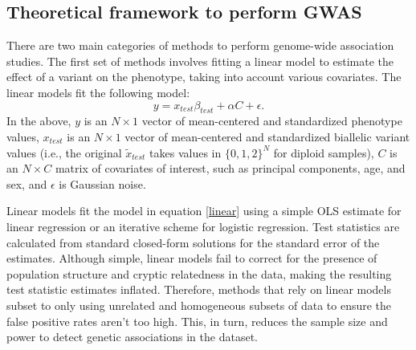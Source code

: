\subsection{Theoretical framework to perform GWAS}
\label{sec:ch1-lmm}
There are two main categories of methods to perform genome-wide association studies. The first set of methods involves fitting a linear model to estimate the effect of a variant on the phenotype, taking into account various covariates. The linear models fit the following model:
\begin{equation}
    y = x_{test}\beta_{test} + \alpha C + \epsilon. \label{linear}
\end{equation}
In the above, \(y\) is an \(N \times 1\) vector of mean-centered and standardized phenotype values, \(x_{test}\) is an \(N \times 1\) vector of mean-centered and standardized biallelic variant values (i.e., the original \(\tilde{x}_{test}\) takes values in \(\{0,1,2\}^N\) for diploid samples), \(C\) is an \(N \times C\) matrix of covariates of interest, such as principal components, age, and sex, and \(\epsilon\) is Gaussian noise.

Linear models fit the model in equation \ref{linear} using a simple OLS estimate for linear regression or an iterative scheme for logistic regression. Test statistics are calculated from standard closed-form solutions for the standard error of the estimates. Although simple, linear models fail to correct for the presence of population structure and cryptic relatedness in the data, making the resulting test statistic estimates inflated. Therefore, methods that rely on linear models subset to only using unrelated and homogeneous subsets of data to ensure the false positive rates aren't too high. This, in turn, reduces the sample size and power to detect genetic associations in the dataset.

